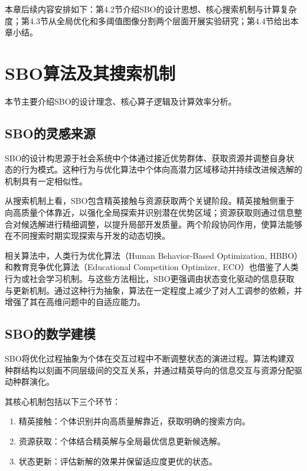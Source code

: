 本章后续内容安排如下：第4.2节介绍SBO的设计思想、核心搜索机制与计算复杂度；第4.3节从全局优化和多阈值图像分割两个层面开展实验研究；第4.4节给出本章小结。


\section{SBO算法及其搜索机制}

本节主要介绍SBO的设计理念、核心算子逻辑及计算效率分析。


\subsection{SBO的灵感来源}

SBO的设计构思源于社会系统中个体通过接近优势群体、获取资源并调整自身状态的行为模式\cite{sbo_ref43,sbo_ref44}。这种行为与优化算法中个体向高潜力区域移动并持续改进候选解的机制具有一定相似性。

从搜索机制上看，SBO包含精英接触与资源获取两个关键阶段。精英接触侧重于向高质量个体靠近，以强化全局探索并识别潜在优势区域；资源获取则通过信息整合对候选解进行精细调整，以提升局部开发质量。两个阶段协同作用，使算法能够在不同搜索时期实现探索与开发的动态切换。

相关算法中，人类行为优化算法（Human Behavior-Based Optimization, HBBO）\cite{sbo_ref45}和教育竞争优化算法（Educational Competition Optimizer, ECO）\cite{sbo_ref46}也借鉴了人类行为或社会学习机制。与这些方法相比，SBO更强调由状态变化驱动的信息获取与更新机制。通过这种行为抽象，算法在一定程度上减少了对人工调参的依赖，并增强了其在高维问题中的自适应能力。


\subsection{SBO的数学建模}

SBO将优化过程抽象为个体在交互过程中不断调整状态的演进过程。算法构建双种群结构以刻画不同层级间的交互关系，并通过精英导向的信息交互与资源分配驱动种群演化。

其核心机制包括以下三个环节：

\begin{enumerate}
\item 精英接触：个体识别并向高质量解靠近，获取明确的搜索方向。

\item 资源获取：个体结合精英解与全局最优信息更新候选解。

\item 状态更新：评估新解的效果并保留适应度更优的状态。
\end{enumerate}

